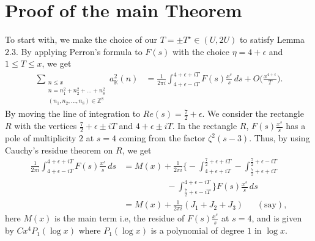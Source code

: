 \documentclass[preprint,12pt]{elsarticle}
\numberwithin{equation}{section}
\begin{document}
\section{Proof of the main Theorem}
To start with, we make the choice of our $T=\pm T^{\star}\in (U,2U)$ to satisfy Lemma $2.3$. By applying Perron's formula \cite{Agranville} to $F(s)$ with the choice $\eta= 4+\epsilon$ and $1\leq T \leq x$, we get
\begin{align*}
	\sum\limits_{\substack{n\leq x \\
			n=n_{1}^{2}+n_{2}^{2}+\dots+n_{8}^{2}\\(n_1,n_2,\dots,n_{8})\in \mathbb{Z}^{8}}} a_{\mathbb{K}}^{2}(n)&= \frac{1}{2\pi i} \int_{4+\epsilon-iT}^{4+\epsilon+iT} F(s) \frac{x^{s}}{s}\,ds+O\Big(\frac{x^{4+\epsilon}}{T}\Big).
\end{align*}
By moving the line of integration to $Re(s)=\frac{7}{2}+\epsilon$. We consider the rectangle $R$ with the vertices $\frac{7}{2}+\epsilon\pm iT$ and $4+\epsilon\pm iT$. In the rectangle $R$, $F(s)\frac{x^{s}}{s}$ has a pole of multiplicity $2$ at $s=4$ coming from the factor $\zeta^{2}(s-3)$. Thus, by using Cauchy's residue theorem on $R$, we get
\begin{align*}
	\frac{1}{2\pi i}\int_{4+\epsilon-iT}^{4+\epsilon+iT}F(s)\frac{x^{s}}{s}\,ds&=M(x)+\frac{1}{2\pi i}\Big\{-\int_{4+\epsilon+iT}^{\frac{7}{2}+\epsilon+iT}-\int_{\frac{7}{2}+\epsilon+iT}^{\frac{7}{2}+\epsilon-iT}\\
	&~~~~~~~~~~~~~~~~~~~~~~~-\int_{\frac{7}{2}+\epsilon-iT}^{4+\epsilon-iT}\Big\}F(s) \frac{x^{s}}{s}\,ds\\
	&=M(x)+\frac{1}{2\pi i}(J_{1}+J_{2}+J_{3})~~~~~~~(\text{say}),
\end{align*}
here $M(x)$ is the main term i.e, the residue of $F(s)\frac{x^{s}}{s}$ at $s=4$, and is given by $Cx^{4}P_{1}(\log{x})$ where $P_{1}(\log{x})$ is a polynomial of degree $1$ in $\log{x}$.\\
\end{document}
